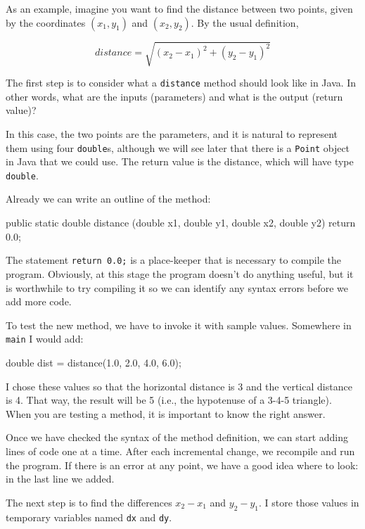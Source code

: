 \documentclass[12pt]{book}
\theoremstyle{exercise}
\begin{document}
As an example, imagine you want to find the distance between two points, given by the coordinates $(x_1, y_1)$ and $(x_2, y_2)$.
By the usual definition,

\begin{equation*}
distance = \sqrt{(x_2 - x_1)^2 +(y_2 - y_1)^2}
\end{equation*}

The first step is to consider what a {\tt distance} method should look like in Java.
In other words, what are the inputs (parameters) and what is the output (return value)?

In this case, the two points are the parameters, and it is natural to represent them using four {\tt double}s, although we will see later that there is a {\tt Point} object in Java that we could use.
The return value is the distance, which will have type {\tt double}.

Already we can write an outline of the method:

\begin{code}
    public static double distance
            (double x1, double y1, double x2, double y2) {
        return 0.0;
    }
\end{code}

The statement {\tt return 0.0;} is a place-keeper that is necessary to compile the program.
Obviously, at this stage the program doesn't do anything useful, but it is worthwhile to try compiling it so we can identify any syntax errors before we add more code.

To test the new method, we have to invoke it with sample values.
Somewhere in {\tt main} I would add:

\begin{code}
    double dist = distance(1.0, 2.0, 4.0, 6.0);
\end{code}

I chose these values so that the horizontal distance is 3 and the vertical distance is 4.
That way, the result will be 5 (i.e., the hypotenuse of a 3-4-5 triangle).
When you are testing a method, it is important to know the right answer.

Once we have checked the syntax of the method definition, we can start adding lines of code one at a time.
After each incremental change, we recompile and run the program.
If there is an error at any point, we have a good idea where to look: in the last line we added.

The next step is to find the differences $x_2 - x_1$ and $y_2 - y_1$.
I store those values in temporary variables named {\tt dx} and {\tt dy}.
\end{document}
